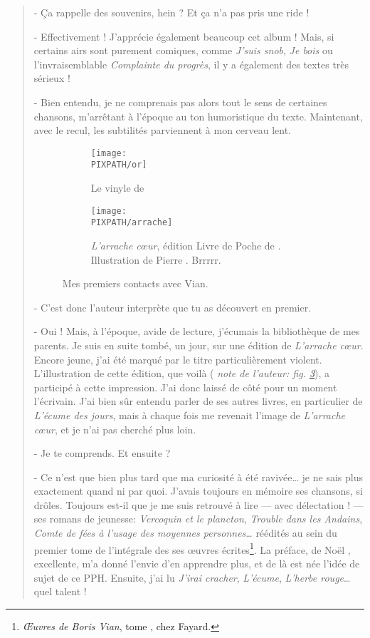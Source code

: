 \begin{quotation}
- Ça rappelle des souvenirs, hein ? Et ça n'a pas pris une ride !

- Effectivement ! J'apprécie également beaucoup cet album ! Mais, si certains
airs sont purement comiques, comme \emph{J'suis snob}, \emph{Je bois} ou l'invraisemblable
\emph{Complainte du progrès}, il y a également des textes très sérieux !

- Bien entendu, je ne comprenais pas alors tout le sens de certaines
chansons, m'arrêtant à l'époque au ton humoristique du texte. Maintenant, avec le recul,
les subtilités parviennent à mon cerveau lent.
\begin{figure}[hbt]
\centering
\begin{subfigure}[b]{.45\textwidth}
\texttt{[image: \\PIXPATH/or]}
\caption{Le vinyle de \BV}
\label{or}
\end{subfigure}\quad%
\begin{subfigure}[b]{.45\textwidth}
\texttt{[image: \\PIXPATH/arrache]}
\caption{\emph{L'arrache c\oe{}ur}, édition Livre de Poche de . Illustration de Pierre . Brrrrr.}
\label{arco}
\end{subfigure}
\caption{Mes premiers contacts avec Vian.}
\end{figure}

- C'est donc l'auteur interprète que tu as découvert en premier.

- Oui ! Mais, à l'époque, avide de lecture, j'écumais la bibliothèque de mes parents. 
Je suis en suite tombé, un jour, sur une édition
de \emph{L'arrache c\oe{}ur}. Encore jeune, j'ai été marqué par
le titre particulièrement violent. L'illustration de cette édition,
que voilà ( \emph{note de l'auteur: fig. \ref{arco}}), a participé à cette impression. J'ai
donc laissé de côté pour un moment l'écrivain. J'ai bien sûr
entendu parler de ses autres livres, en particulier de
\emph{L'écume des jours}, mais à chaque fois me revenait
l'image de \emph{L'arrache c\oe{}ur}, et je n'ai pas cherché
plus loin.

- Je te comprends. Et ensuite ?

- Ce n'est que bien plus tard que ma curiosité à été ravivée\ldots
je ne sais plus exactement quand ni par quoi. J'avais toujours
en mémoire ses chansons, si drôles.
Toujours est-il
que je me suis retrouvé à lire --- avec délectation ! --- ses romans
de jeunesse: \emph{Vercoquin et le plancton}, \emph{Trouble dans
les Andains}, \emph{Comte de fées à l'usage des moyennes personnes}\ldots
réédités au sein du premier tome de l'intégrale des ses \oe{}uvres
écrites\footnote{\emph{\OE{}uvres de Boris Vian}, tome , chez Fayard.}.
La préface, de Noël , excellente, m'a donné l'envie d'en apprendre plus,
et de là est née l'idée de sujet de ce PPH.
Ensuite, j'ai lu \emph{J'irai cracher}, \emph{L'écume}, \emph{L'herbe rouge}\ldots quel talent !


\end{quotation}
